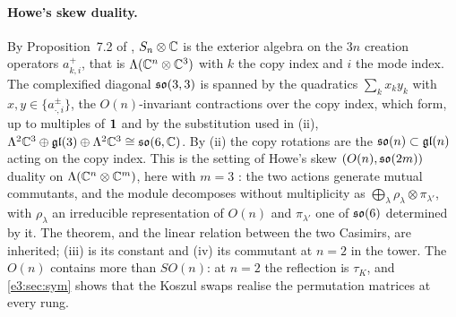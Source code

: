\paragraph{Howe's skew duality.} By Proposition~7.2 of \cite{RE}, $S_n\otimes\mathbb{C}$ is the exterior algebra on the $3n$ creation operators
$a^+_{k,i}$, that is $\Lambda(\mathbb{C}^n\otimes\mathbb{C}^3)$ with $k$ the copy index and $i$ the mode index. The complexified diagonal $\mathfrak{so}(3,3)$ is spanned by
the quadratics $\sum_kx_ky_k$ with $x,y\in\{a^\pm_{\cdot,i}\}$, the $O(n)$-invariant contractions over the copy index, which form, up to multiples
of $\mathbf 1$ and by the substitution used in (ii),
$\Lambda^2\mathbb{C}^3\oplus\mathfrak{gl}(3)\oplus\Lambda^2\mathbb{C}^3\cong\mathfrak{so}(6,\mathbb{C})$. By (ii) the copy rotations are the $\mathfrak{so}(n)\subset\mathfrak{gl}(n)$ acting on the copy index.
This is the setting of Howe's skew $(O(n),\mathfrak{so}(2m))$ duality on $\Lambda(\mathbb{C}^n\otimes\mathbb{C}^m)$, here with $m=3$ \cite{Howe89}: the two actions generate mutual
commutants, and the module decomposes without multiplicity as $\bigoplus_\lambda\rho_\lambda\otimes\pi_{\lambda'}$, with $\rho_\lambda$ an irreducible
representation of $O(n)$ and $\pi_{\lambda'}$ one of $\mathfrak{so}(6)$ determined by it. The theorem, and the linear relation between the two Casimirs, are
inherited; (iii) is its constant and (iv) its commutant at $n=2$ in the tower. The $O(n)$ contains more than $SO(n)$: at $n=2$ the reflection is
$\tau_K$, and \cref{e3:sec:sym} shows that the Koszul swaps realise the permutation matrices at every rung.

